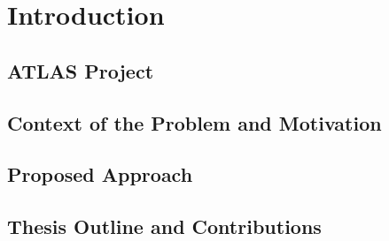\chapter{Introduction}
\section{ATLAS Project}
\section{Context of the Problem and Motivation}
\section{Proposed Approach}
\section{Thesis Outline and Contributions}